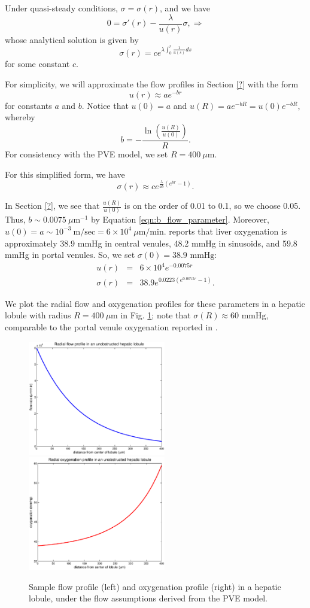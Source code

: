 \documentclass[smallextended,natbib]{svjour3}
\newcommand{\beqa}{\begin{eqnarray}}
\newcommand{\beq}{\begin{equation}}
\newcommand{\eeqa}{\end{eqnarray}}
\newcommand{\eeq}{\end{equation}}
\newcommand{\micron}{\mu\textrm{m}}
\begin{document}
Under quasi-steady conditions, $\sigma =\sigma(r)$, and we have 
\beq
0 = \sigma'(r) - \frac{ \lambda }{ u(r) } \sigma , 
\Longrightarrow 
\eeq
whose analytical solution is given by 
\beq
\sigma(r) = c e^{ \lambda \int_0^r \frac{1}{u(s)} ds }
\eeq
for some constant $c$.  

For simplicity, we will approximate the flow profiles in 
Section \ref{?} with the form 
\beq
u(r) \approx a e^{-b r} 
\eeq
for constants $a$ and $b$. 
Notice that $u(0) = a$ and $u(R) = a e^{-bR} = u(0) e^{-bR}$, whereby 
\beq
b = - \frac{ \ln \left( \frac{u(R)}{u(0)} \right) }{R} . 
\label{eqn:b_flow_parameter}
\eeq
For consistency with the PVE model, we set $R = 400\:\micron$. 

For this simplified form, we have 
\beq
\sigma(r) \approx  c e^{ \frac{ \lambda }{ ab} \left( e^{br} - 1 \right) }. 
\eeq

In Section \ref{?}, we see that $\frac{ u(R) }{ u(0) }$ is on the order of 0.01 to 0.1, so 
we choose 0.05. Thus, $b \sim 0.0075 \: \micron^{-1}$ by Equation \ref{eqn:b_flow_parameter}. 
Moreover, $u(0) = a \sim 10^{-3} \: \mathrm{m/sec} = 6 \times 10^4 \: \micron/\mathrm{min} $. 
\cite{tsukada} 
reports that liver oxygenation is approximately 38.9 mmHg in central venules, 48.2 mmHg in sinusoids, 
and 59.8 mmHg in portal venules. So, we set $\sigma(0) = 38.9 \textrm{ mmHg}$: 
\beqa
u(r) & = & 6 \times 10^4 e^{ -0.0075 r} \\
\sigma(r) & = & 38.9 e^{ 0.0223 \left( e^{0.0075 r } - 1 \right)  }. 
\label{eqn:analytical_oxygen}
\eeqa

We plot 
the radial flow and oxygenation profiles for these parameters in a hepatic lobule with 
radius $R = 400 \:\micron$ 
in Fig. \ref{fig:radial_flow_oxygenation}; note that $\sigma(R) \approx 60 \textrm{ mmHg}$, comparable to 
the portal venule oxygenation reported in \cite{tsukada}. 

\begin{figure}
\includegraphics[width=6cm]{./figures/flow.eps}
\includegraphics[width=6cm]{./figures/O2.eps}
\caption{Sample flow profile (left) and oxygenation profile (right) in a hepatic lobule, 
under the flow assumptions derived from the PVE model.}
\label{fig:radial_flow_oxygenation}
\end{figure}
\end{document}

